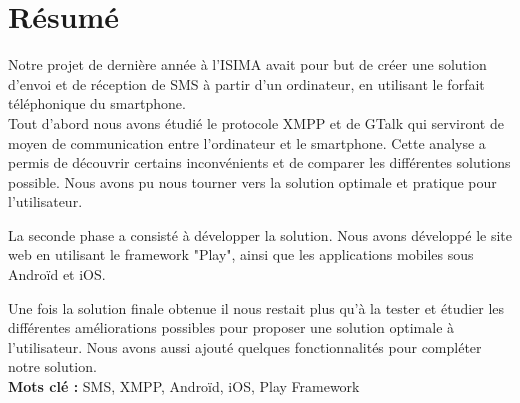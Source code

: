 \newpage



\chapter*{Résumé}

\thispagestyle{empty}



Notre projet de dernière année à l'ISIMA avait pour but de créer une solution d'envoi et de réception de SMS à partir d'un ordinateur, en utilisant le forfait téléphonique du smartphone.
\\


Tout d'abord nous avons étudié le protocole XMPP et de GTalk qui serviront de moyen de communication entre l'ordinateur et le smartphone.
Cette analyse a permis de découvrir certains inconvénients et de comparer les différentes solutions possible.
Nous avons pu nous tourner vers la solution optimale et pratique pour l'utilisateur.

La seconde phase a consisté à développer la solution.
Nous avons développé le site web en utilisant le framework "Play", ainsi que les applications mobiles sous Androïd et iOS.

Une fois la solution finale obtenue il nous restait plus qu'à la tester et étudier les différentes améliorations possibles pour proposer une solution optimale à l'utilisateur.
Nous avons aussi ajouté quelques fonctionnalités pour compléter notre solution.
\\



\textbf{Mots clé : }
SMS, XMPP, Androïd, iOS, Play Framework
